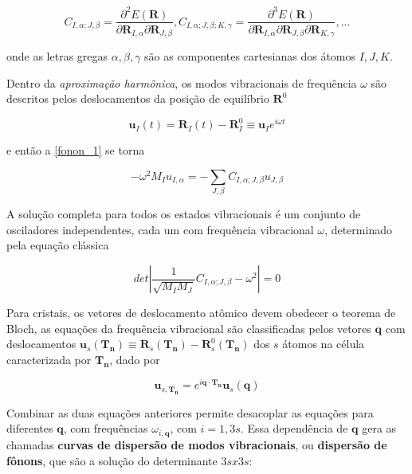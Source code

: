 	\begin{equation}
		C_{I, \alpha; J, \beta} = \frac{\partial^2 E(\mathbf{R})}{\partial \mathbf{R}_{I, \alpha}\partial\mathbf{R}_{J, \beta}}, C_{I, \alpha; J, \beta; K, \gamma} = \frac{\partial^3 E(\mathbf{R})}{\partial \mathbf{R}_{I, \alpha}\partial\mathbf{R}_{J, \beta} \partial\mathbf{R}_{K, \gamma}}, ...
	\end{equation}
	
	onde as letras gregas $\alpha, \beta, \gamma$ são as componentes cartesianas dos átomos $I, J, K$. 
	
	Dentro da \textit{aproximação harmônica}, os modos vibracionais de frequência $\omega$ são descritos pelos deslocamentos da posição de equilíbrio $\textbf{R}^0$
	
	\begin{equation}
		\textbf{u}_I(t) = \textbf{R}_I(t) - \textbf{R}^0_I \equiv \textbf{u}_Ie^{i\omega t}
	\end{equation}
	
	e então a \autoref{fonon_1} se torna
	
	\begin{equation}
		-\omega^2M_Iu_{I,\alpha} = -\sum_{J,\beta}C_{I, \alpha; J, \beta} u_{J,\beta}
	\end{equation}
	
	A solução completa para todos os estados vibracionais é um conjunto de osciladores independentes, cada um com frequência vibracional $\omega$, determinado pela equação clássica
	
	\begin{equation}
		det\left| \frac{1}{\sqrt{M_IM_J}}C_{I, \alpha; J, \beta} - \omega^2 \right| = 0
	\end{equation}
	
	Para cristais, os vetores de deslocamento atômico devem obedecer o teorema de Bloch, as equações da frequência vibracional são classificadas pelos vetores $\mathbf{q}$ com deslocamentos $\mathbf{u}_s(\mathbf{T_n}) \equiv \mathbf{R}_s(\mathbf{T_n}) - \mathbf{R}^0_s(\mathbf{T_n})$ dos $s$ átomos na célula caracterizada por $\mathbf{T_n}$, dado por
	
	\begin{equation}
		\mathbf{u}_{s,{\mathbf{T_n}}}= e^{i\mathbf{q}\cdot\mathbf{T_n}}\mathbf{u}_s(\mathbf{q})
	\end{equation}
	
	Combinar as duas equações anteriores permite desacoplar as equações para diferentes $\mathbf{q}$, com frequências $\omega_{i,\mathbf{q}}$, com $i=1,3s$. Essa dependência de $\mathbf{q}$ gera as chamadas \textbf{curvas de dispersão de modos vibracionais}, ou \textbf{dispersão de fônons}, que são a solução do determinante $3s x 3s$:
	
